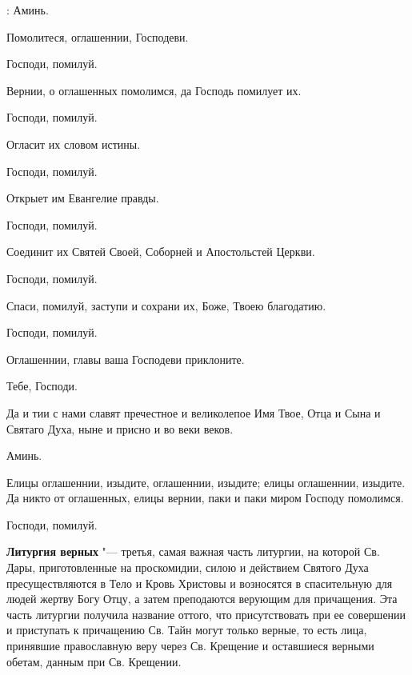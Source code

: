 \begin{mymulticols}
: Аминь. 


 Помолитеся, оглашеннии, Господеви.

 Господи, помилуй.

 Вернии, о оглашенных помолимся, да Господь помилует их.

 Господи, помилуй.

 Огласит их словом истины.

 Господи, помилуй.

 Открыет им Евангелие правды.

 Господи, помилуй.

 Соединит их Святей Своей, Соборней и Апостольстей Церкви.

 Господи, помилуй.

 Спаси, помилуй, заступи и сохрани их, Боже, Твоею благодатию.

 Господи, помилуй.

 Оглашеннии, главы ваша Господеви приклоните.

 Тебе, Господи.

 Да и тии с нами славят пречестное и великолепое Имя Твое, Отца и Сына и Святаго Духа, ныне и присно и во веки веков.

 Аминь.

 Елицы оглашеннии, изыдите, оглашеннии, изыдите; елицы оглашеннии, изыдите. Да никто от оглашенных, елицы вернии, паки и паки миром Господу помолимся.

 Господи, помилуй.


\end{mymulticols}

\mychapterending


\textbf{Литургия верных} "--- третья, самая важная часть литургии, на которой Св. Дары, приготовленные на проскомидии, силою и действием Святого Духа пресуществляются в Тело и Кровь Христовы и возносятся в спасительную для людей жертву Богу Отцу, а затем преподаются верующим для причащения. Эта часть литургии получила название оттого, что присутствовать при ее совершении и приступать к причащению Св. Тайн могут только верные, то есть лица, принявшие православную веру через Св. Крещение и оставшиеся верными обетам, данным при Св. Крещении.

